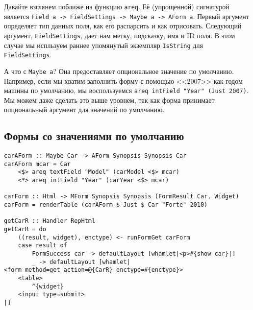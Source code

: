 Давайте взглянем поближе на функцию \lstinline'areq'. Её (упрощенной) сигнатурой является
\lstinline'Field a -> FieldSettings -> Maybe a -> AForm a'. 
Первый аргумент определяет тип данных поля, как его распарсить и как отрисовать.
Следующий аргумент, \lstinline'FieldSettings', дает нам метку, подсказку, имя и  ID
поля. В этом случае мы испльзуем раннее упомянутый экземпляр \lstinline'IsString' для 
\lstinline'FieldSettings'.

А что с \lstinline'Maybe a'? Она предоставляет опциональное значение по умолчанию. 
Например, если мы хватим заполнить форму с помощью <<2007>> как годом машины по
умолчанию, мы воспользуемся \lstinline'areq intField "Year" (Just 2007)'. Мы можем даже
сделать это выше уровнем, так как форма принимает опциональный аргумент для значений по
умолчанию.

\subsection{Формы со значениями по умолчанию}
\begin{remark}
\begin{lstlisting}
carAForm :: Maybe Car -> AForm Synopsis Synopsis Car
carAForm mcar = Car
    <$> areq textField "Model" (carModel <$> mcar)
    <*> areq intField "Year" (carYear <$> mcar)

carForm :: Html -> MForm Synopsis Synopsis (FormResult Car, Widget)
carForm = renderTable (carAForm $ Just $ Car "Forte" 2010)

getCarR :: Handler RepHtml
getCarR = do
    ((result, widget), enctype) <- runFormGet carForm
    case result of
        FormSuccess car -> defaultLayout [whamlet|<p>#{show car}|]
        _ -> defaultLayout [whamlet|
<form method=get action=@{CarR} enctype=#{enctype}>
    <table>
        ^{widget}
    <input type=submit>
|]
\end{lstlisting}
\end{remark}

